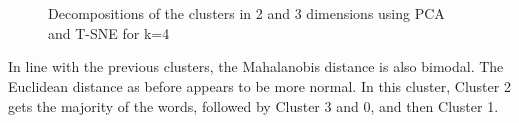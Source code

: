 \begin{figure}[H]
	\centering
	\\
	\\
	\caption{Decompositions of the clusters in 2 and 3 dimensions using PCA and T-SNE for k=4}
	\label{fig:k4pca}
\end{figure}
In line with the previous clusters, the Mahalanobis distance is also bimodal. The Euclidean distance as before appears to be more normal. In this cluster, Cluster 2 gets the majority of the words, followed by Cluster 3 and 0, and then Cluster 1. 

